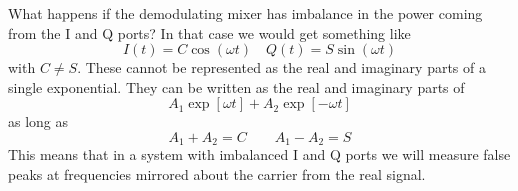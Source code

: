 
What happens if the demodulating mixer has imbalance in the power coming from the I and Q ports? In that case we would get something like \begin{equation}
I(t) = C \cos (\omega t) \quad Q(t) = S \sin (\omega t) \end{equation}
with $C \neq S$. These cannot be represented as the real and imaginary parts of a single exponential. They can be written as the real and imaginary parts of \begin{equation}
A_1 \exp \left[ \omega t \right] + A_2 \exp \left[ -\omega t \right] \end{equation}
as long as \begin{equation}
A_1 + A_2 = C \qquad A_1 - A_2 = S \end{equation}
This means that in a system with imbalanced I and Q ports we will measure false peaks at frequencies mirrored about the carrier from the real signal.
